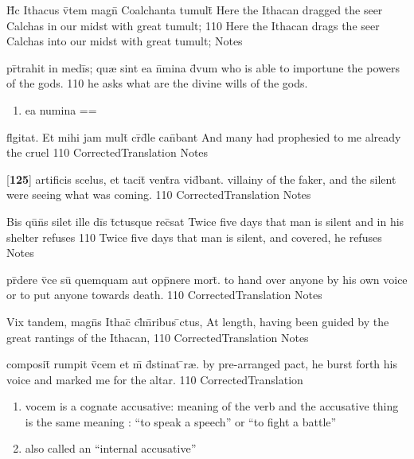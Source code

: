 \latline
  {H\={\macron {\i}}c Ithacus v\={}tem magn\={} Coalchanta tumult\={}}
  { Here the Ithacan dragged the seer Calchas in our midst with great tumult;  }
  {110}
  { Here the Ithacan drags the seer Calchas into our midst with great tumult; }
  { Notes }


\latline
  {pr\={}trahit in medi\={}s; qu{\ae} sint ea n\={}mina d\={\macron {\i}}vum}
  { who is able to importune the powers of the gods. }
  {110}
  { he asks what are the divine wills of the gods.  }
  { \begin{enumerate}
  	\item ea numina ==
  \end{enumerate} }


\latline
  {fl\={}gitat.  Et mihi jam mult\={\macron {\i}} cr\={}d\={}le can\={}bant}
  { And many had prophesied to me already the cruel   }
  {110}
  { CorrectedTranslation }
  { Notes }


\latline
  {[\textbf{125}] artificis scelus, et tacit\={\macron {\i}} vent\={}ra vid\={}bant.}
  { villainy of the faker, and the silent were seeing what was coming. }
  {110}
  { CorrectedTranslation }
  { Notes }


\latline
  {Bis qu\={\macron {\i}}n\={}s silet ille di\={}s t\={}ctusque rec\={}sat}
  { Twice five days that man is silent and in his shelter refuses  }
  {110}
  { Twice five days that man is silent, and covered, he refuses }
  { Notes }


\latline
  {pr\={}dere v\={}ce su\={} quemquam aut opp\={}nere mort\={\macron {\i}}.}
  { to hand over anyone by his own voice or to put anyone towards death. }
  {110}
  { CorrectedTranslation }
  { Notes }


\latline
  {Vix tandem, magn\={\macron {\i}}s Ithac\={\macron {\i}} cl\={}m\={}ribus \={}ctus,}
  { At length, having been guided by the great rantings of the Ithacan, }
  {110}
  { CorrectedTranslation }
  { Notes }


\latline
  {composit\={} rumpit v\={}cem et m\={} d\={}stinat \={}r{\ae}.}
  { by pre-arranged pact, he burst forth his voice and marked me for the altar.  }
  {110}
  { CorrectedTranslation }
  { \begin{enumerate}
  	\item vocem is a cognate accusative: meaning of the verb and the accusative thing is the same meaning :  ``to speak a speech'' or ``to fight a battle''
  	\item also called an ``internal accusative''
  \end{enumerate} }


